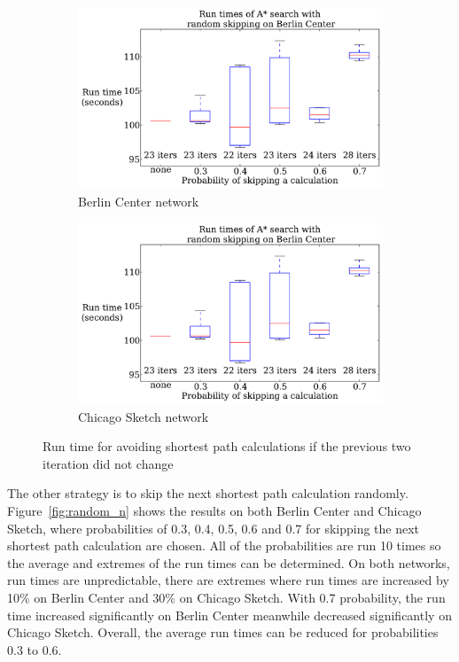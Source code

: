 \begin{figure}[t]
    \centering
    \begin{subfigure}{.5\textwidth}
        \centering
        \includegraphics[page=3,width=\textwidth]{img/random_time}
        \caption{Berlin Center network}
        \label{fig:berlin_skip_n}
    \end{subfigure}%
    \begin{subfigure}{.5\textwidth}
        \centering
        \includegraphics[page=4,width=\textwidth]{img/random_time}
        \caption{Chicago Sketch network}
        \label{fig:chicago_skip_n}
    \end{subfigure}
    \caption{Run time for avoiding shortest path calculations if the previous two iteration did not change}
    \label{fig:skip_n}
\end{figure}


The other strategy is to skip the next shortest path calculation randomly.
Figure~\ref{fig:random_n} shows the results on both Berlin Center and Chicago Sketch, where probabilities of 0.3, 0.4, 0.5, 0.6 and 0.7 for skipping the next shortest path calculation are chosen.
All of the probabilities are run 10 times so the average and extremes of the run times can be determined.
On both networks, run times are unpredictable,
there are extremes where run times are increased by 10\% on Berlin Center and 30\% on Chicago Sketch. With 0.7 probability, the run time increased significantly on Berlin Center meanwhile decreased significantly on Chicago Sketch.
Overall, the average run times can be reduced for probabilities 0.3 to 0.6.

